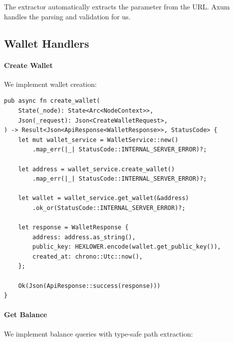 The  extractor automatically extracts the  parameter from the URL. Axum handles the parsing and validation for us.

\subsection{Wallet Handlers}

\paragraph{Create Wallet}

We implement wallet creation:

\begin{listing}[htbp]
\caption{Create wallet handler}
\label{lst:handler-create-wallet}
\begin{verbatim}
pub async fn create_wallet(
    State(_node): State<Arc<NodeContext>>,
    Json(_request): Json<CreateWalletRequest>,
) -> Result<Json<ApiResponse<WalletResponse>>, StatusCode> {
    let mut wallet_service = WalletService::new()
        .map_err(|_| StatusCode::INTERNAL_SERVER_ERROR)?;

    let address = wallet_service.create_wallet()
        .map_err(|_| StatusCode::INTERNAL_SERVER_ERROR)?;

    let wallet = wallet_service.get_wallet(&address)
        .ok_or(StatusCode::INTERNAL_SERVER_ERROR)?;

    let response = WalletResponse {
        address: address.as_string(),
        public_key: HEXLOWER.encode(wallet.get_public_key()),
        created_at: chrono::Utc::now(),
    };

    Ok(Json(ApiResponse::success(response)))
}
\end{verbatim}
\end{listing}

\paragraph{Get Balance}

We implement balance queries with type-safe path extraction:

